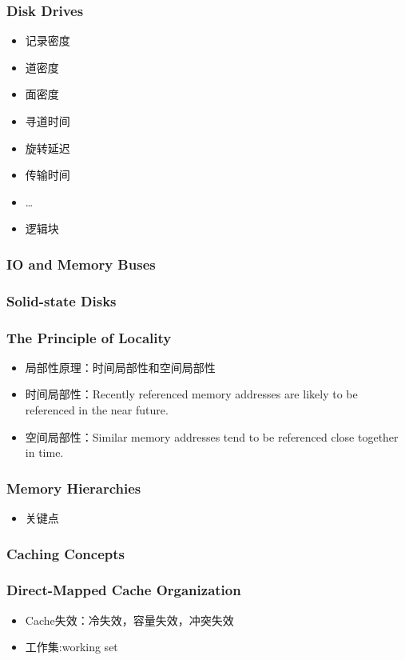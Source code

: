 \documentclass[a4paper, 11pt]{article}
\begin{document}
\subsubsection{Disk Drives}
\begin{itemize}
  \item{记录密度}
  \item{道密度}
  \item{面密度}
  \item{寻道时间}
  \item{旋转延迟}
  \item{传输时间}
  \item{\dots}
  \item{逻辑块}
  \end{itemize}
  \subsubsection{IO and Memory Buses}
  \subsubsection{Solid-state Disks}
  \subsubsection{The Principle of Locality}
  \begin{itemize}
	\item{局部性原理：时间局部性和空间局部性}
	\item{时间局部性：Recently referenced memory addresses are likely to be referenced in the near future.}
	\item{空间局部性：Similar memory addresses tend to be referenced close together in time.}
	\end{itemize}
  \subsubsection{Memory Hierarchies}
  \begin{itemize}
	\item{关键点}
	\end{itemize}
  \subsubsection{Caching Concepts}
  \subsubsection{Direct-Mapped Cache Organization}
  \begin{itemize}
	\item{Cache失效：冷失效，容量失效，冲突失效}
	\item{工作集:working set}
	\end{itemize}
\end{document}
